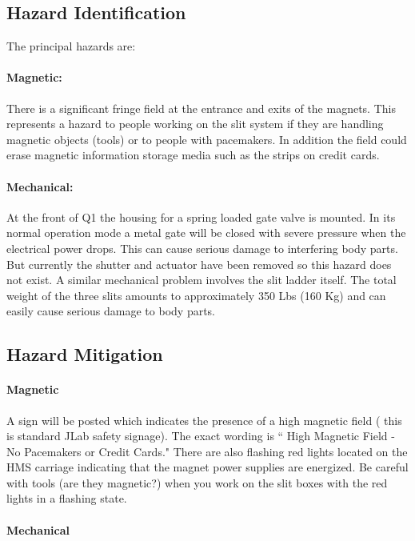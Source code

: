 \subsection{Hazard Identification}

The principal hazards are:
\paragraph{Magnetic:} There is a significant fringe field at
the entrance and exits of the magnets. This represents a hazard
to people working on the slit system if they are handling magnetic
objects (tools) or to people with pacemakers. In addition the field could erase magnetic
information storage media such as the strips on credit cards.
\paragraph{Mechanical:} At the front of Q1 the housing for a spring loaded gate valve is
mounted. In its normal operation mode a metal gate will be closed with
severe pressure when the electrical power drops. This can cause serious
damage to interfering body parts.  But currently the shutter and
actuator have been removed so this hazard does not exist.  
A similar mechanical problem involves the slit ladder itself. The total weight of
the three slits amounts to approximately 350 Lbs (160 Kg) and can easily
cause serious damage to body parts.

\subsection{Hazard Mitigation}

\paragraph{Magnetic}

A sign will be posted which indicates the presence of a high magnetic
field ( this is standard JLab safety signage). The exact wording is
`` High Magnetic Field - No Pacemakers or Credit Cards." There are also
flashing red lights located on the HMS carriage indicating that the
magnet power supplies are energized. Be careful with tools (are they magnetic?)
when you work on the slit boxes with the red lights in a flashing state.

\paragraph{Mechanical}

